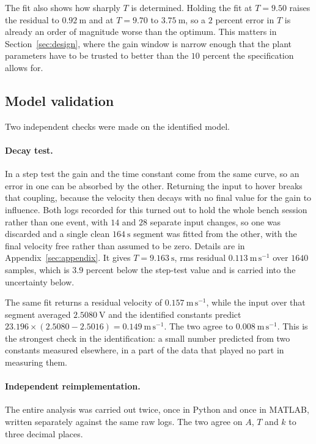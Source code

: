 The fit also shows how sharply $T$ is determined. Holding the fit at $T = 9.50$ raises the
residual to $0.92\ \mathrm{m}$ and at $T = 9.70$ to $3.75\ \mathrm{m}$, so a $2$ percent error in
$T$ is already an order of magnitude worse than the optimum. This matters in
Section~\ref{sec:design}, where the gain window is narrow enough that the plant parameters have to
be trusted to better than the $10$ percent the specification allows for.

\subsection{Model validation}
Two independent checks were made on the identified model.

\paragraph{Decay test.} In a step test the gain and the time constant come from the same curve, so
an error in one can be absorbed by the other. Returning the input to hover breaks that coupling,
because the velocity then decays with no final value for the gain to influence. Both logs recorded
for this turned out to hold the whole bench session rather than one event, with $14$ and $28$
separate input changes, so one was discarded and a single clean $164\ \mathrm{s}$ segment was
fitted from the other, with the final velocity free rather than assumed to be zero. Details are in
Appendix~\ref{sec:appendix}. It gives $T = 9.163\ \mathrm{s}$, rms residual
$0.113\ \mathrm{m\,s^{-1}}$ over $1640$ samples, which is $3.9$ percent below the step-test value
and is carried into the uncertainty below.

The same fit returns a residual velocity of $0.157\ \mathrm{m\,s^{-1}}$, while the input over that
segment averaged $2.5080\ \mathrm{V}$ and the identified constants predict
$23.196 \times (2.5080 - 2.5016) = 0.149\ \mathrm{m\,s^{-1}}$. The two agree to
$0.008\ \mathrm{m\,s^{-1}}$. This is the strongest check in the identification: a small number
predicted from two constants measured elsewhere, in a part of the data that played no part in
measuring them.

\paragraph{Independent reimplementation.} The entire analysis was carried out twice, once in
Python and once in MATLAB, written separately against the same raw logs. The two agree on $A$,
$T$ and $k$ to three decimal places.

